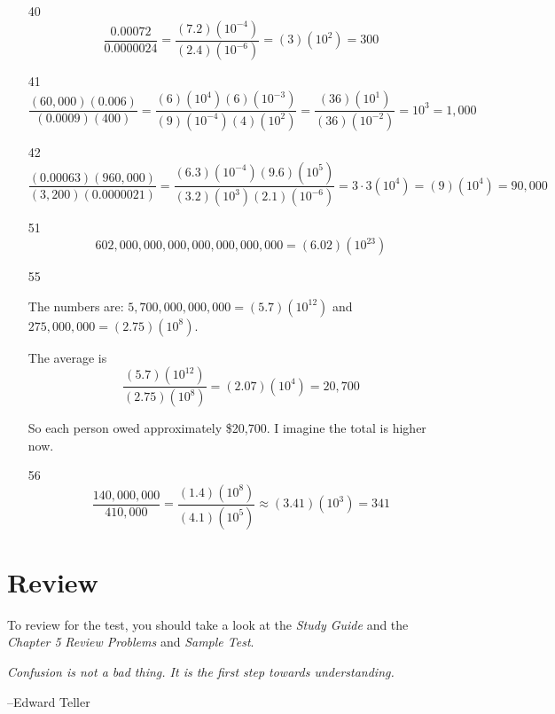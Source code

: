 \documentclass[fleqn,addpoints]{exam}
\begin{document}
\begin{itemize}
\item[40]
\[
  \frac{0.00072}{0.0000024} = \frac{(7.2)(10^{-4})}{(2.4)(10^{-6})} = (3)(10^{2}) = 300
\]

\item[41]
\[
  \frac{(60,000)(0.006)}{(0.0009)(400)} = \frac{(6)(10^{4})(6)(10^{-3})}{(9)(10^{-4})(4)(10^{2})}
  = \frac{(36)(10^{1})}{(36)(10^{-2})}
  = 10^3 = 1,000
\]

\item[42]
\[
  \frac{(0.00063)(960,000)}{(3,200)(0.0000021)}
  = \frac{(6.3)(10^{-4}) (9.6)(10^{5})}{(3.2)(10^{3})(2.1)(10^{-6})}
  = 3 \cdot 3 (10^4) = (9)(10^4) = 90,000
\]


\item[51]
\[
  602,000,000,000,000,000,000,000 = (6.02)(10^{23})
\]

\item[55]

The numbers are: $5,700,000,000,000 = (5.7)(10^{12})$ and $275,000,000 = (2.75)(10^{8})$.

The average is
\[
  \frac{(5.7)(10^{12})}{(2.75)(10^{8})} = (2.07)(10^{4}) = 20,700
\]

So each person owed approximately \$20,700.  I imagine the total is higher now.

\item[56]
\[
  \frac{140,000,000}{410,000} = \frac{(1.4)(10^8)}{(4.1)(10^5)} \approx (3.41)(10^3) = 341
\]

\end{itemize}

\fi

\ifprintanswers
\else
\section{Review}

To review for the test, you should take a look at the {\em Study Guide} and the {\em Chapter 5} {\em Review Problems} and 
{\em Sample Test}.

\fi




\ifprintanswers
\else
\vspace{4 in}

{\em Confusion is not a bad thing.  It is the first step towards understanding.}

\hspace{0.5 in} --Edward Teller

\fi
\end{document}

